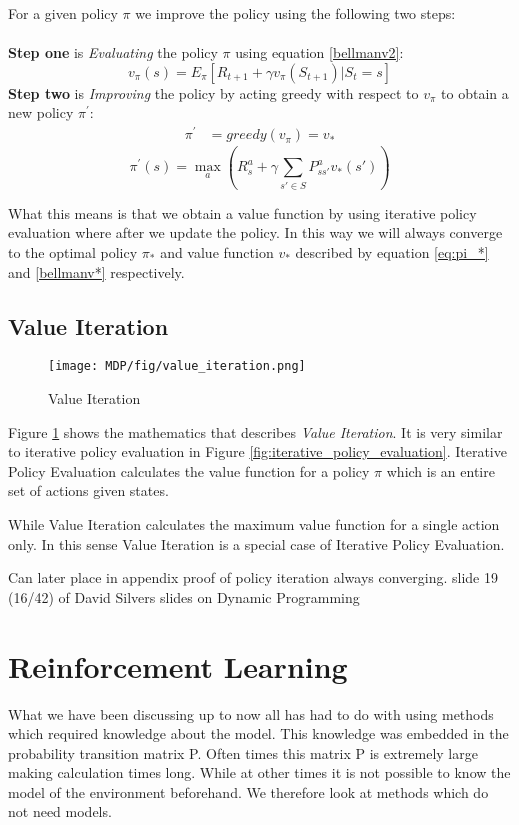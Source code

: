 For a given policy $\pi$ we improve the policy using the following two steps:\\\\
\textbf{Step one} is \textit{Evaluating} the policy $\pi$ using equation \ref{bellmanv2}: \[v_{\pi}(s) = E_{\pi}[R_{t+1} + \gamma v_{\pi}(S_{t+1})|S_t = s]\]
\textbf{Step two} is \textit{Improving} the policy by acting greedy with respect to $v_\pi$ to obtain a new policy $\pi^{'}$:
\begin{align}
	\pi^{'} &= greedy(v_{\pi})= v_{*}
	\label{pi'}
\end{align}
\[\pi^{'}(s) = \max\limits_{a}(R^{a}_s+\gamma\sum_{s'\in S}P^{a}_{ss'}v_*(s'))\]

What this means is that we obtain a value function by using iterative policy evaluation where after we update the policy. In this way we will always converge to the optimal policy $\pi_{*}$ and value function $v_{*}$ described by equation \ref{eq:pi_*} and \ref{bellmanv*} respectively.
\subsection{Value Iteration}
\begin{figure}[!htb]
	\centering
	\texttt{[image: MDP/fig/value\_iteration.png]}
	\caption{Value Iteration\cite{David_Silver}}
	\label{fig:value_iteration}
\end{figure}
Figure \ref{fig:value_iteration} shows the mathematics that describes \textit{Value Iteration}. It is very similar to iterative policy evaluation in Figure \ref{fig:iterative_policy_evaluation}. Iterative Policy Evaluation calculates the value function for a policy $\pi$ which is an entire set of actions given states.

While Value Iteration calculates the maximum value function for a single action only. In this sense Value Iteration is a special case of Iterative Policy Evaluation.

{\color{red} Can later place in appendix proof of policy iteration always converging. slide 19 (16/42) of David Silvers slides on Dynamic Programming}
\section{Reinforcement Learning}
What we have been discussing up to now all has had to do with using methods which required knowledge about the model. This knowledge was embedded in the probability transition matrix P. Often times this matrix P is extremely large making calculation times long. While at other times it is not possible to know the model of the environment beforehand. We therefore look at methods which do not need models.

